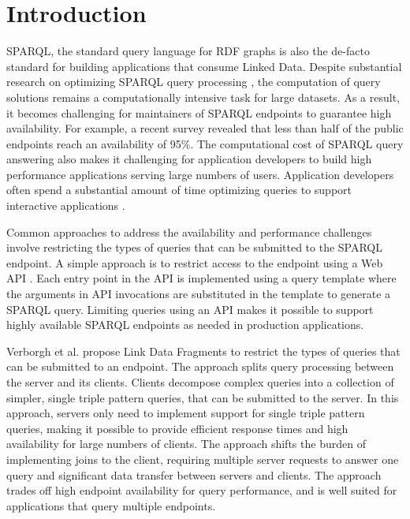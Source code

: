 \section{Introduction}
SPARQL, the standard query language for RDF graphs is also the de-facto standard for building applications that consume Linked Data. 
Despite substantial research on optimizing SPARQL query processing \cite{Pham2013}, the computation of query solutions remains a computationally intensive task for large datasets.
As a result, it becomes challenging for maintainers of SPARQL endpoints to guarantee high availability.
For example, a recent survey \cite{buil2013sparql} revealed that less than half of the public endpoints reach an availability of 95\%.
The computational cost of SPARQL query answering also makes it challenging for application developers to build high performance applications serving large numbers of users.
Application developers often spend a substantial amount of time optimizing queries to support interactive applications \cite{Loizou_Angles_Groth_2014}.

Common approaches to address the availability and performance challenges involve restricting the types of queries that can be submitted to the SPARQL endpoint.
A simple approach is to restrict access to the endpoint using a Web API \cite{Groth_Loizou_Gray_Goble_Harland_Pettifer_2014}.
Each entry point in the API is implemented using a query template where the arguments in API invocations are substituted in the template to generate a SPARQL query.
Limiting queries using an API makes it possible to support highly available SPARQL endpoints as needed in production applications.

Verborgh et al. \cite{Verborgh2014} propose Link Data Fragments to restrict the types of queries that can be submitted to an endpoint. 
The approach splits query processing between the server and its clients.
Clients decompose complex queries into a collection of simpler, single triple pattern queries, that can be submitted to the server.
In this approach, servers only need to implement support for single triple pattern queries, making it possible to provide efficient response times and high availability for large numbers of clients.
The approach shifts the burden of implementing joins to the client, requiring multiple server requests to answer one query and significant data transfer between servers and clients. 
The approach trades off high endpoint availability for query performance, and is well suited for applications that query multiple endpoints.

